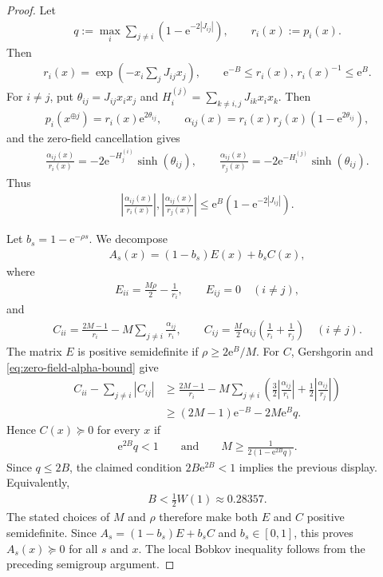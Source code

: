 \documentclass[11pt]{article}
\theoremstyle{plain}
\theoremstyle{definition}
\theoremstyle{remark}
\newcommand{\e}{\mathrm{e}}
\newcommand{\tuple}[1]{\left(#1\right)}
\newcommand{\tp}{\tuple}
\newcommand{\abs}[1]{\left\vert#1\right\vert}
\begin{document}
\begin{proof}
Let
\begin{align*}
    q:=\max_i\sum_{j\neq i}\tp{1-\e^{-2|J_{ij}|}},
    \qquad
    r_i(x):=p_i(x).
\end{align*}
Then
\begin{align*}
    r_i(x)=\exp\tp{-x_i\sum_jJ_{ij}x_j},
    \qquad
    \e^{-B}\le r_i(x),\, r_i(x)^{-1}\le \e^B.
\end{align*}
For $i\neq j$, put $\theta_{ij}=J_{ij}x_ix_j$ and
$H_i^{(j)}=\sum_{k\neq i,j}J_{ik}x_ix_k$. Then
\begin{align*}
    p_i(x^{\oplus j})=r_i(x)\e^{2\theta_{ij}},
    \qquad
    \alpha_{ij}(x)=r_i(x)r_j(x)\tp{1-\e^{2\theta_{ij}}},
\end{align*}
and the zero-field cancellation gives
\begin{align*}
    \frac{\alpha_{ij}(x)}{r_i(x)}
    =-2\e^{-H_j^{(i)}}\sinh(\theta_{ij}),
    \qquad
    \frac{\alpha_{ij}(x)}{r_j(x)}
    =-2\e^{-H_i^{(j)}}\sinh(\theta_{ij}).
\end{align*}
Thus
\begin{align}\label{eq:zero-field-alpha-bound}
    \abs{\frac{\alpha_{ij}(x)}{r_i(x)}},
    \abs{\frac{\alpha_{ij}(x)}{r_j(x)}}
    \le \e^B\tp{1-\e^{-2|J_{ij}|}}.
\end{align}

Let $b_s=1-\e^{-\rho s}$. We decompose
\begin{align*}
    A_s(x)=(1-b_s)E(x)+b_sC(x),
\end{align*}
where
\begin{align*}
    E_{ii}=\frac{M\rho}{2}-\frac1{r_i},
    \qquad E_{ij}=0\quad(i\neq j),
\end{align*}
and
\begin{align*}
    C_{ii}=\frac{2M-1}{r_i}-M\sum_{j\neq i}\frac{\alpha_{ij}}{r_i},
    \qquad
    C_{ij}=\frac{M}{2}\alpha_{ij}\tp{\frac1{r_i}+\frac1{r_j}}
    \quad(i\neq j).
\end{align*}
The matrix $E$ is positive semidefinite if $\rho\ge 2\e^B/M$. For $C$, Gershgorin and
\eqref{eq:zero-field-alpha-bound} give
\begin{align*}
    C_{ii}-\sum_{j\neq i}|C_{ij}|
    &\ge
    \frac{2M-1}{r_i}
    -M\sum_{j\neq i}\tp{
        \frac32\abs{\frac{\alpha_{ij}}{r_i}}
        +\frac12\abs{\frac{\alpha_{ij}}{r_j}}
    }\\
    &\ge (2M-1)\e^{-B}-2M\e^Bq.
\end{align*}
Hence $C(x)\succeq0$ for every $x$ if
\begin{align*}
    \e^{2B}q<1
    \qquad\text{and}\qquad
    M\ge \frac{1}{2(1-\e^{2B}q)}.
\end{align*}
Since $q\le 2B$, the claimed condition $2B\e^{2B}<1$ implies the previous display.
Equivalently,
\begin{align*}
    B<\frac12 W(1)\approx 0.28357.
\end{align*}
The stated choices of $M$ and $\rho$ therefore make both $E$ and $C$ positive
semidefinite. Since $A_s=(1-b_s)E+b_sC$ and $b_s\in[0,1]$, this proves
$A_s(x)\succeq0$ for all $s$ and $x$. The local Bobkov inequality follows from
the preceding semigroup argument.
\end{proof}
\end{document}
